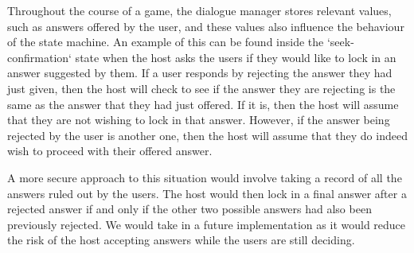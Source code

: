 \documentclass[hidelinks, 11pt]{article}
\begin{document}
Throughout the course of a game, the dialogue manager stores relevant values, such as answers offered by the user, and these values also influence the behaviour of the state machine. An example of this can be found inside the `seek-confirmation` state when the host asks the users if they would like to lock in an answer suggested by them. If a user responds by rejecting the answer they had just given, then the host will check to see if the answer they are rejecting is the same as the answer that they had just offered. If it is, then the host will assume that they are not wishing to lock in that answer. However, if the answer being rejected by the user is another one, then the host will assume that they do indeed wish to proceed with their offered answer.

A more secure approach to this situation would involve taking a record of all the answers ruled out by the users. The host would then lock in a final answer after a rejected answer if and only if the other two possible answers had also been previously rejected. We would take in a future implementation as it would reduce the risk of the host accepting answers while the users are still deciding.
\end{document}
